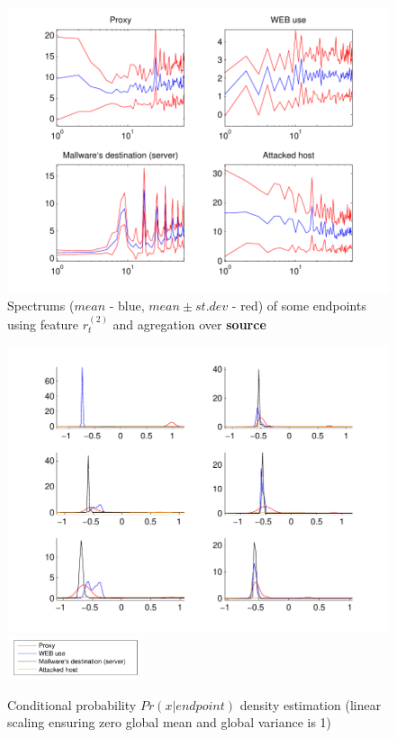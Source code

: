 \documentclass[a4paper]{IEEEtran}
\begin{document}
\begin{figure}[t!]%
  \centering
  \includegraphics[width=150mm]{spect_src_logp}
  \caption{Spectrums ($mean$ - blue, $mean\pm st.dev$ - red) of some  endpoints using feature $r_t^{(2)}$ and agregation over \textbf{source}}
  \label{fig:spect_src_logp}
\end{figure}
\begin{figure}[t!]%
  \centering
  \includegraphics[width=140mm]{dens_dst_bdivp}
      \includegraphics[width=40mm]{legend}
  \caption{Conditional probability $Pr(x|endpoint)$ density estimation (linear scaling ensuring zero global mean and global variance is 1)}
  \label{fig:dens_dst_bdivp}
\end{figure}
\end{document}

